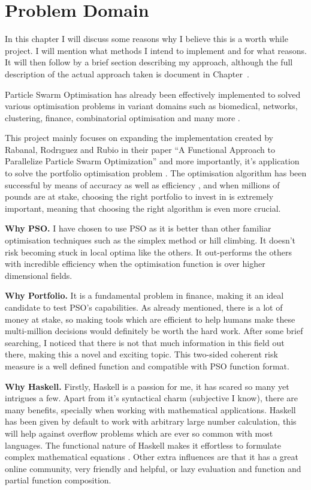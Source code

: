 \chapter{Problem Domain}

  In this chapter I will discuss some reasons why I believe this is a worth while project. I will mention what methods I intend to implement and for what reasons. It will then follow by a brief section describing my approach, although the full description of the actual approach taken is document in Chapter~.
  
  Particle Swarm Optimisation has already been effectively implemented to solved various optimisation problems \cite{pso_app,pso_app2,pso_app3} in variant domains such as biomedical, networks, clustering, finance, combinatorial optimisation and many more \cite{pso_app_main}. 

  This project mainly focuses on expanding the implementation created by Rabanal, Rodrıguez and Rubio in their paper ``A Functional Approach to Parallelize Particle Swarm Optimization'' and more importantly, it's application to solve the portfolio optimisation problem \cite{marko2}. The optimisation algorithm has been successful by means of accuracy as well as efficiency \cite{haskellPSO}, and when millions of pounds are at stake, choosing the right portfolio to invest in is extremely important, meaning that choosing the right algorithm is even more crucial.

  \textbf{Why PSO.} I have chosen to use PSO as it is better than other familiar optimisation techniques such as the simplex method or hill climbing. It doesn't risk becoming stuck in local optima like the others. It out-performs the others with incredible efficiency when the optimisation function is over higher dimensional fields. 

  \textbf{Why Portfolio.} It is a fundamental problem in finance, making it an ideal candidate to test PSO's capabilities. As already mentioned, there is a lot of money at stake, so making tools which are efficient to help humans make these multi-million decisions would definitely be worth the hard work. After some brief searching, I noticed that there is not that much information in this field out there, making this a novel and exciting topic. This two-sided coherent risk measure is a well defined function and compatible with PSO function format. 

  \textbf{Why Haskell.} Firstly, Haskell is a passion for me, it has scared so many yet intrigues a few. Apart from it's syntactical charm (subjective I know), there are many benefits, specially when working with mathematical applications. Haskell has been given by default to work with arbitrary large number calculation, this will help against overflow problems which are ever so common with most languages. The functional nature of Haskell makes it effortless to formulate complex mathematical equations \cite{haskellPSO}. Other extra influences are that it has a great online community, very friendly and helpful, or lazy evaluation and function and partial function composition. 


